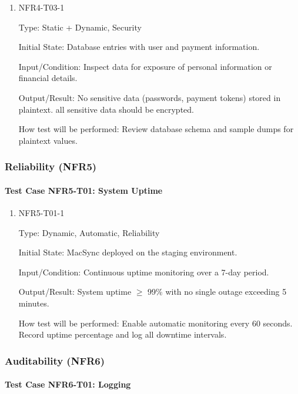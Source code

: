 \documentclass[12pt, titlepage]{article}
\begin{document}
\begin{enumerate}
\item{NFR4-T03-1\\}

Type: Static + Dynamic, Security

Initial State: Database entries with user and payment information.

Input/Condition: Inspect data for exposure of personal information or financial details.

Output/Result: No sensitive data (passwords, payment tokens) stored in plaintext. all sensitive data should be encrypted.

How test will be performed: Review database schema and sample dumps for plaintext values.
\end{enumerate}

\subsubsection{Reliability (NFR5)}

\paragraph{Test Case NFR5-T01: System Uptime}

\begin{enumerate}
\item{NFR5-T01-1\\}

Type: Dynamic, Automatic, Reliability

Initial State: MacSync deployed on the staging environment.

Input/Condition: Continuous uptime monitoring over a 7-day period. 

Output/Result: System uptime $\geq$ 99\% with no single outage exceeding 5 minutes.

How test will be performed: Enable automatic monitoring every 60 seconds. Record uptime percentage and log all downtime intervals.
\end{enumerate}

\subsubsection{Auditability (NFR6)}

\paragraph{Test Case NFR6-T01: Logging}
\end{document}
